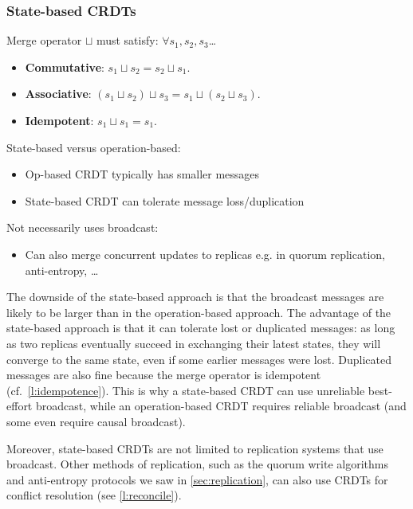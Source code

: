 \begin{frame}
    \label{s:state-crdt}
    \frametitle{State-based CRDTs}
    Merge operator $\sqcup$ must satisfy: $\forall s_1, s_2, s_3$\dots
    \begin{itemize}
        \item \textbf{Commutative}: $s_1 \sqcup s_2 = s_2 \sqcup s_1.$
        \item \textbf{Associative}: $(s_1 \sqcup s_2) \sqcup s_3 = s_1 \sqcup (s_2 \sqcup s_3).$
        \item \textbf{Idempotent}: $s_1 \sqcup s_1 = s_1.$\\[1em]\pause
    \end{itemize}
    State-based versus operation-based:
    \begin{itemize}
        \item Op-based CRDT typically has smaller messages
        \item State-based CRDT can tolerate message loss/duplication\\[1em]\pause
    \end{itemize}
    Not necessarily uses broadcast:
    \begin{itemize}
        \item Can also merge concurrent updates to replicas e.g. in quorum replication, anti-entropy, \dots
    \end{itemize}
\end{frame}
\label{l:state-crdt}

The downside of the state-based approach is that the broadcast messages are likely to be larger than in the operation-based approach.
The advantage of the state-based approach is that it can tolerate lost or duplicated messages: as long as two replicas eventually succeed in exchanging their latest states, they will converge to the same state, even if some earlier messages were lost.
Duplicated messages are also fine because the merge operator is idempotent (cf.\ \autoref{l:idempotence}).
This is why a state-based CRDT can use unreliable best-effort broadcast, while an operation-based CRDT requires reliable broadcast (and some even require causal broadcast).

Moreover, state-based CRDTs are not limited to replication systems that use broadcast.
Other methods of replication, such as the quorum write algorithms and anti-entropy protocols we saw in \autoref{sec:replication}, can also use CRDTs for conflict resolution (see \autoref{l:reconcile}).

